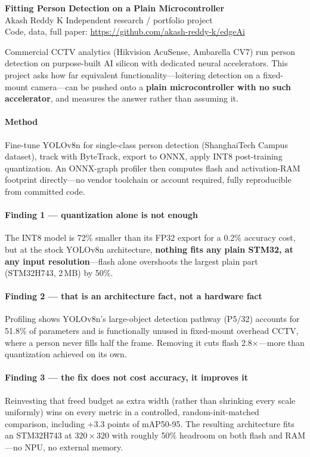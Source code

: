 \documentclass[11pt]{article}
\begin{document}
\begin{center}
{\Large\textbf{Fitting Person Detection on a Plain Microcontroller}}\\[0.3em]
Akash Reddy K \quad\textbar\quad Independent research / portfolio project\\
Code, data, full paper: \url{https://github.com/akash-reddy-k/edgeAi}
\end{center}

\vspace{0.4em}

Commercial CCTV analytics (Hikvision AcuSense, Ambarella CV7) run person
detection on purpose-built AI silicon with dedicated neural accelerators.
This project asks how far equivalent functionality---loitering detection on
a fixed-mount camera---can be pushed onto a \textbf{plain microcontroller
with no such accelerator}, and measures the answer rather than assuming it.

\paragraph{Method} Fine-tune YOLOv8n for single-class person detection
(ShanghaiTech Campus dataset), track with ByteTrack, export to ONNX, apply
INT8 post-training quantization. An ONNX-graph profiler then computes flash
and activation-RAM footprint directly---no vendor toolchain or account
required, fully reproducible from committed code.

\paragraph{Finding 1 --- quantization alone is not enough} The INT8 model
is 72\% smaller than its FP32 export for a 0.2\% accuracy cost, but at the
stock YOLOv8n architecture, \textbf{nothing fits any plain STM32, at any
input resolution}---flash alone overshoots the largest plain part
(STM32H743, 2\,MB) by 50\%.

\paragraph{Finding 2 --- that is an architecture fact, not a hardware fact}
Profiling shows YOLOv8n's large-object detection pathway (P5/32) accounts
for 51.8\% of parameters and is functionally unused in fixed-mount overhead
CCTV, where a person never fills half the frame. Removing it cuts flash
2.8$\times$---more than quantization achieved on its own.

\paragraph{Finding 3 --- the fix does not cost accuracy, it improves it}
Reinvesting that freed budget as extra width (rather than shrinking every
scale uniformly) wins on every metric in a controlled, random-init-matched
comparison, including $+3.3$ points of mAP50-95. The resulting architecture
fits an STM32H743 at $320\times320$ with roughly 50\% headroom on both
flash and RAM---no NPU, no external memory.
\end{document}
